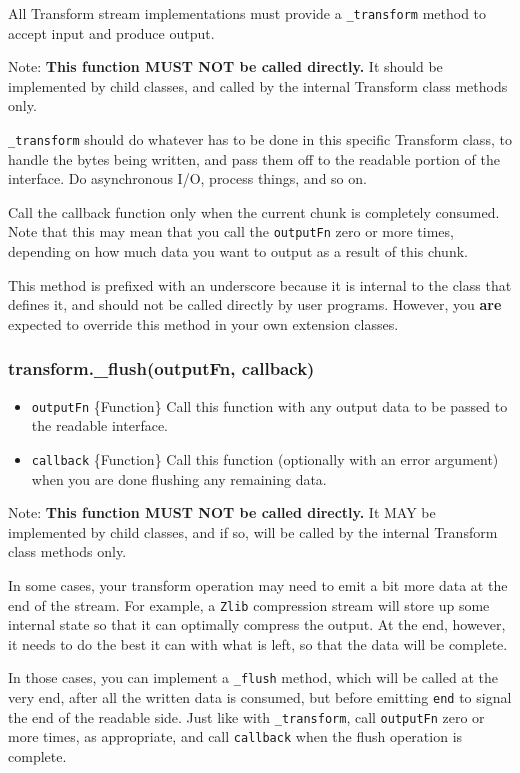 All Transform stream implementations must provide a \texttt{\_transform}
method to accept input and produce output.

Note: \textbf{This function MUST NOT be called directly.} It should be
implemented by child classes, and called by the internal Transform class
methods only.

\texttt{\_transform} should do whatever has to be done in this specific
Transform class, to handle the bytes being written, and pass them off to
the readable portion of the interface. Do asynchronous I/O, process
things, and so on.

Call the callback function only when the current chunk is completely
consumed. Note that this may mean that you call the \texttt{outputFn}
zero or more times, depending on how much data you want to output as a
result of this chunk.

This method is prefixed with an underscore because it is internal to the
class that defines it, and should not be called directly by user
programs. However, you \textbf{are} expected to override this method in
your own extension classes.

\subsubsection{transform.\_flush(outputFn, callback)}

\begin{itemize}
\item
  \texttt{outputFn} \{Function\} Call this function with any output data
  to be passed to the readable interface.
\item
  \texttt{callback} \{Function\} Call this function (optionally with an
  error argument) when you are done flushing any remaining data.
\end{itemize}

Note: \textbf{This function MUST NOT be called directly.} It MAY be
implemented by child classes, and if so, will be called by the internal
Transform class methods only.

In some cases, your transform operation may need to emit a bit more data
at the end of the stream. For example, a \texttt{Zlib} compression
stream will store up some internal state so that it can optimally
compress the output. At the end, however, it needs to do the best it can
with what is left, so that the data will be complete.

In those cases, you can implement a \texttt{\_flush} method, which will
be called at the very end, after all the written data is consumed, but
before emitting \texttt{end} to signal the end of the readable side.
Just like with \texttt{\_transform}, call \texttt{outputFn} zero or more
times, as appropriate, and call \texttt{callback} when the flush
operation is complete.

